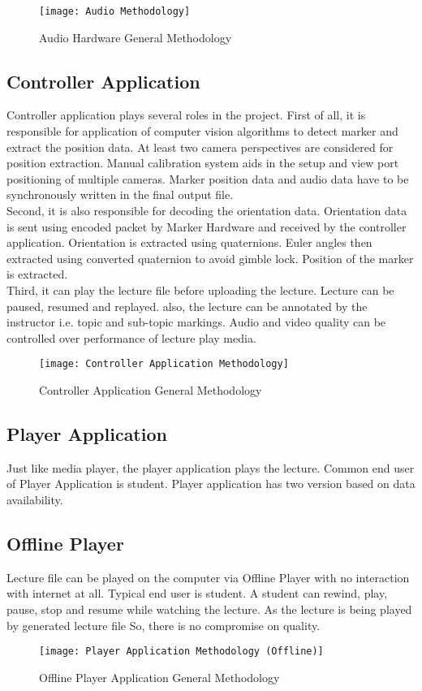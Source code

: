 \newpage
\begin{figure}[h]
  \centering
  \texttt{[image: Audio Methodology]}
  \caption{Audio Hardware General Methodology}
\end{figure}

\subsection{Controller Application}
Controller application plays several roles in the project. First of all, it is responsible for application of computer vision algorithms to detect marker and extract the position data. At least two camera perspectives are considered for position extraction. Manual calibration system aids in the setup and view port positioning of multiple cameras. Marker position data and audio data have to be synchronously written in the final output file.\\
Second, it is also responsible for decoding the orientation data. Orientation data is sent using encoded packet by Marker Hardware and received by the controller application. Orientation is extracted using quaternions. Euler angles then extracted using converted quaternion to avoid gimble lock. Position of the marker is extracted.\\
Third, it can play the lecture file before uploading the lecture. Lecture can be paused, resumed and replayed. also, the lecture can be annotated by the instructor i.e. topic and sub-topic markings. Audio and video quality can be controlled over performance of lecture play media.\\

\bigskip
\begin{figure}[h]
  \centering
  \texttt{[image: Controller Application Methodology]}
  \caption{Controller Application General Methodology}
\end{figure}
\bigskip
\bigskip
\subsection{Player Application}
Just like media player, the player application plays the lecture. Common end user of Player Application is student. Player application has two version based on data availability.
\bigskip
\bigskip
\subsection{Offline Player}
Lecture file can be played on the computer via Offline Player with no interaction with internet at all. Typical end user is student. A student can rewind, play, pause, stop and resume while watching the lecture. As the lecture is being played by generated lecture file So, there is no compromise on quality.
\newpage
\begin{figure}[h]
  \centering
  \texttt{[image: Player Application Methodology (Offline)]}
  \caption{Offline Player Application General Methodology}
\end{figure}

